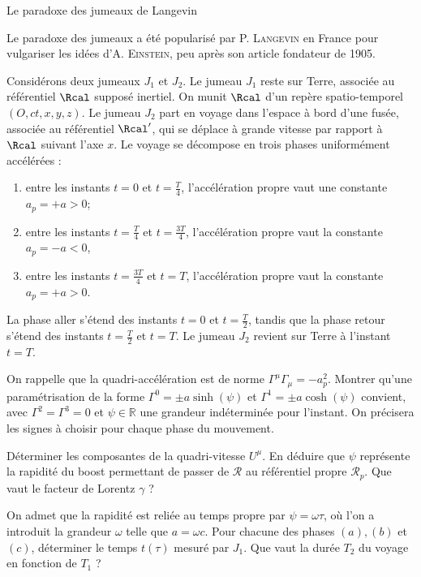 \begin{exo}[PC][1][devoir]{Le paradoxe des jumeaux de Langevin}

  Le paradoxe des jumeaux a été popularisé par P. \textsc{Langevin} en France pour vulgariser les idées d’A. \textsc{Einstein}, peu après son article fondateur de 1905.
  
  Considérons deux jumeaux $J_1$ et $J_2$. Le jumeau $J_1$ reste sur Terre, associée au référentiel $\Rcal$ supposé inertiel. On munit $\Rcal$ d’un repère spatio-temporel $(O,ct,x,y,z)$. Le jumeau $J_2$ part en voyage dans l'espace à bord d'une fusée, associée au référentiel $\Rcal^\prime$, qui se déplace à grande vitesse par rapport à $\Rcal$ suivant l’axe $x$.
Le voyage se décompose en trois phases uniformément accélérées :
\begin{enumerate}
  \item 
  entre les instants $t=0$ et $t=\frac{T}{4}$, l'accélération propre vaut une constante $a_p=+a>0$;
  \item entre les instants $t=\frac{T}{4}$ et $t=\frac{3 T}{4}$, l'accélération propre vaut la constante $a_p=-a<0$,
  \item entre les instants $t=\frac{3 T}{4}$ et $t=T$, l'accélération propre vaut la constante $a_p=+a>0$.
\end{enumerate}
  
La phase aller s'étend des instants $t=0$ et $t=\frac{T}{2}$, tandis que la phase retour s'étend des instants $t=\frac{T}{2}$ et $t=T$. Le jumeau $J_2$ revient sur Terre à l'instant $t=T$.
\begin{quest}
  \item	
   On rappelle que la quadri-accélération est de norme $\Gamma^\mu \Gamma_\mu=-a_p^2$. Montrer qu'une paramétrisation de la forme $\Gamma^0= \pm a \sinh (\psi)$ et $\Gamma^1= \pm a \cosh (\psi)$ convient, avec $\Gamma^2=\Gamma^3=0$ et $\psi \in \mathbb{R}$ une grandeur indéterminée pour l'instant. On précisera les signes à choisir pour chaque phase du mouvement.
  \item Déterminer les composantes de la quadri-vitesse $U^\mu$. En déduire que $\psi$ représente la rapidité du boost permettant de passer de $\mathcal{R}$ au référentiel propre $\mathcal{R}_p$. Que vaut le facteur de Lorentz $\gamma$ ?
\item On admet que la rapidité est reliée au temps propre par $\psi=\omega \tau$, où l'on a introduit la grandeur $\omega$ telle que $a=\omega c$. Pour chacune des phases $(a),(b)$ et $(c)$, déterminer le temps $t(\tau)$ mesuré par $J_1$. Que vaut la durée $T_2$ du voyage en fonction de $T_1$ ?


\end{quest}
\end{exo}
